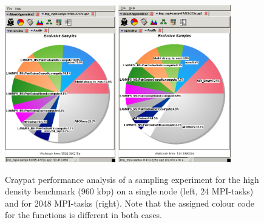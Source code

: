 \documentclass[12pt,onecolumn]{article}
\begin{document}
\begin{figure}[htbp]
\centering
\begin{minipage}{0.92\textwidth}
\centering
\includegraphics[width=0.43\textwidth]{./pics/n1_opt_screenshot1_1mbps.png}
\includegraphics[width=0.437\textwidth]{./pics/p2048_opt_screenshot1_1mbps.png}
\caption{\label{perf-1mbps}Craypat performance analysis of a sampling experiment for the high density benchmark (960 kbp) on a single node (left, 24 MPI-tasks) and for 2048 MPI-tasks (right). Note that the assigned colour code for the functions is different in both cases.}
\end{minipage}
\end{figure}
\end{document}
